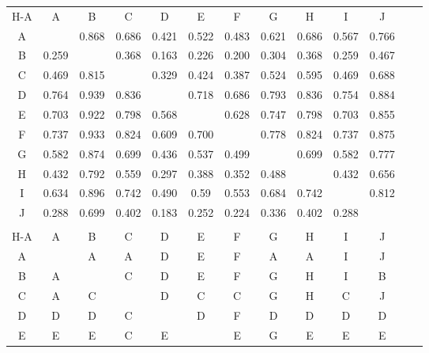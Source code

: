 \documentclass[12pt]{article}
\begin{document}
\begin{table}[h]
\centering
\begin{tabular}{ccccccccccccc}
H-A   & A     & B     & C     & D     & E     & F     & G     & H     & I     & J     &  &          \\
A     &       & 0.868 & 0.686 & 0.421 & 0.522 & 0.483 & 0.621 & 0.686 & 0.567 & 0.766 &  &          \\
B     & 0.259 &       & 0.368 & 0.163 & 0.226 & 0.200 & 0.304 & 0.368 & 0.259 & 0.467 &  &          \\
C     & 0.469 & 0.815 &       & 0.329 & 0.424 & 0.387 & 0.524 & 0.595 & 0.469 & 0.688 &  &          \\
D     & 0.764 & 0.939 & 0.836 &       & 0.718 & 0.686 & 0.793 & 0.836 & 0.754 & 0.884 &  &          \\
E     & 0.703 & 0.922 & 0.798 & 0.568 &       & 0.628 & 0.747 & 0.798 & 0.703 & 0.855 &  &          \\
F     & 0.737 & 0.933 & 0.824 & 0.609 & 0.700 &       & 0.778 & 0.824 & 0.737 & 0.875 &  &          \\
G     & 0.582 & 0.874 & 0.699 & 0.436 & 0.537 & 0.499 &       & 0.699 & 0.582 & 0.777 &  &          \\
H     & 0.432 & 0.792 & 0.559 & 0.297 & 0.388 & 0.352 & 0.488 &       & 0.432 & 0.656 &  &          \\
I     & 0.634 & 0.896 & 0.742 & 0.490 & 0.59  & 0.553 & 0.684 & 0.742 &       & 0.812 &  &          \\
J     & 0.288 & 0.699 & 0.402 & 0.183 & 0.252 & 0.224 & 0.336 & 0.402 & 0.288 &       &  &          \\
      &       &       &       &       &       &       &       &       &       &       &  &          \\
H-A   & A     & B     & C     & D     & E     & F     & G     & H     & I     & J     &  &          \\
A     &       & A     & A     & D     & E     & F     & A     & A     & I     & J     &  &          \\
B     & A     &       & C     & D     & E     & F     & G     & H     & I     & B     &  &          \\
C     & A     & C     &       & D     & C     & C     & G     & H     & C     & J     &  &          \\
D     & D     & D     & C     &       & D     & F     & D     & D     & D     & D     &  &          \\
E     & E     & E     & C     & E     &       & E     & G     & E     & E     & E     &  &          \\

\end{tabular}
\end{table}
\end{document}
